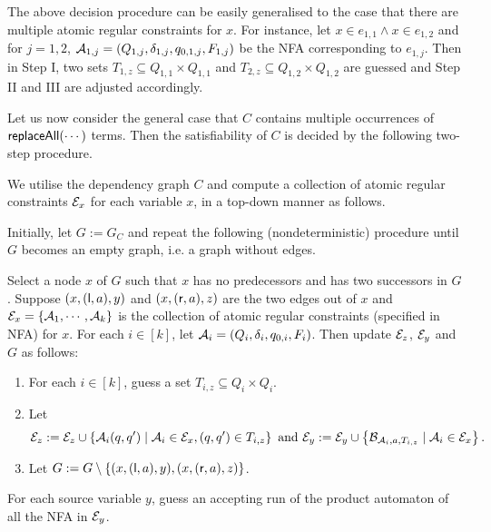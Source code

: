 The above decision procedure can be easily generalised to the case that there are multiple atomic regular constraints for $x$. For instance, let $x \in e_{1,1} \wedge x \in e_{1,2}$ and for $j = 1, 2$, $\mathcal{A}_{1,j} = (Q_{1,j}, \delta_{1, j}, q_{0,1, j}, F_{1,j})$ be 
the NFA corresponding to $e_{1,j}$. Then in Step I, two sets $T_{1,z} \subseteq Q_{1,1} \times Q_{1,1}$ and $T_{2,z} \subseteq Q_{1,2} \times Q_{1,2}$ are guessed and Step II and III are adjusted accordingly.

\begin{example}

\end{example}



Let us now consider the general case that $C$ contains multiple occurrences of $\mathsf{replaceAll}(\cdots)$ terms. 
Then the satisfiability of $C$ is decided by the following two-step procedure.

\smallskip

 We utilise the dependency graph $C$ and compute a collection of atomic regular constraints $\mathcal{E}_x$ for each variable $x$, in a top-down manner as follows. 

Initially, let $G:= G_C$ and repeat the following (nondeterministic) procedure until $G$ becomes an empty graph, i.e. a graph without edges. 

Select a node $x$ of $G$ such that $x$ has no predecessors and has two successors in $G$. Suppose $(x, (\mathsf{l}, a), y)$ and $(x, (\mathsf{r},a), z)$ are the two edges out of $x$ and $\mathcal{E}_x=\{\mathcal{A}_1,\cdots, \mathcal{A}_k\}$ is the collection of atomic regular constraints (specified in NFA) for $x$. For each $i \in [k]$, let $\mathcal{A}_i = (Q_i, \delta_i, q_{0,i}, F_i)$. Then update $\mathcal{E}_z$, $\mathcal{E}_y$ and $G$ as follows:  
\begin{enumerate}
\item For each $i \in [k]$, guess a set $T_{i, z} \subseteq Q_i \times Q_i$.
%
\item Let 
$$\mathcal{E}_z:= \mathcal{E}_z \cup \left\{\mathcal{A}_i(q,q') \mid \mathcal{A}_i \in \mathcal{E}_x, (q,q') \in T_{i,z} \right\} \mbox{ and } \mathcal{E}_y: = \mathcal{E}_y \cup \left\{\mathcal{B}_{\mathcal{A}_i, a, T_{i,z}} \mid \mathcal{A}_i \in \mathcal{E}_x \right\}.$$
%
\item Let $G:= G \setminus \{(x, (\mathsf{l}, a), y), (x, (\mathsf{r},a), z)\}$.
\end{enumerate}

\smallskip

 For each source variable $y$, guess an accepting run of the product automaton of all the NFA in $\mathcal{E}_y$. 


